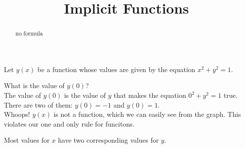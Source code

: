 \documentclass{ximera}
\title{Implicit Functions}
\begin{document}
\begin{abstract}
no formula
\end{abstract}
\maketitle






Let $y(x)$ be a function whose values are given by the equation $x^2 + y^2 = 1$.

What is the value of $y(0)$? \\

The value of $y(0)$ is the value of $y$ that makes the equation $0^2 + y^2 = 1$ true. \\

There are two of them: $y(0) = -1$ and $y(0) = 1$. \\


Whoops!  $y(x)$ is not a function, which we can easily see from the graph. This violates our one and only rule for funcitons.






\begin{image}
\end{image}


Most values for $x$ have two corresponding values for $y$. \\
\end{document}
